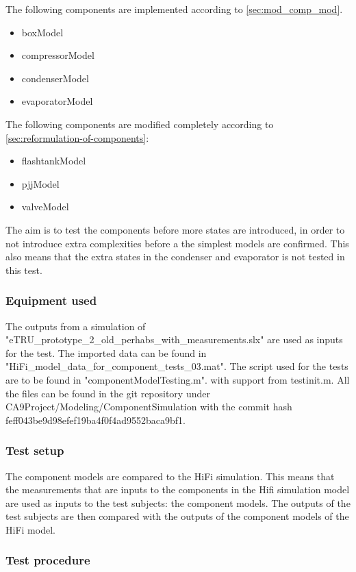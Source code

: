 The following components are implemented according to \cref{sec:mod_comp_mod}.
\begin{itemize}
	\item boxModel
	\item compressorModel
	\item condenserModel
	\item evaporatorModel
\end{itemize}

The following components are modified completely according to \cref{sec:reformulation-of-components}:

\begin{itemize}
	\item flashtankModel
	\item pjjModel
	\item valveModel
\end{itemize}

The aim is to test the components before more states are introduced, in order to not introduce extra complexities before a the simplest models are confirmed. This also means that the extra states in the condenser and evaporator is not tested in this test.


\subsubsection*{Equipment used}
The outputs from a simulation of "eTRU\_prototype\_2\_old\_perhabs\_with\_measurements.slx" are used as inputs for the test. The imported data can be found in "HiFi\_model\_data\_for\_component\_tests\_03.mat".
The script used for the tests are to be found in "componentModelTesting.m". with support from testinit.m.
All the files can be found in the git repository under CA9Project/Modeling/ComponentSimulation with the commit hash feff043be9d98efef19ba4f0f4ad9552baca9bf1.

\subsubsection*{Test setup}
The component models are compared to the HiFi simulation. This means that the measurements that are inputs to the components in the Hifi simulation model are used as inputs to the test subjects: the component models. The outputs of the test subjects are then compared with the outputs of the component models of the HiFi model.

\subsubsection*{Test procedure}
%
%


